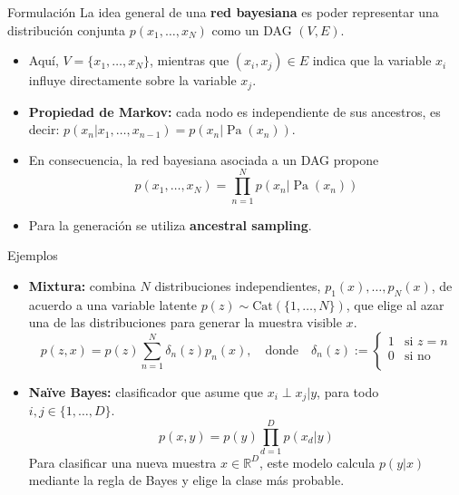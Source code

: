 \documentclass{beamer}
\newcommand{\R}{\mathbb{R}}
\begin{document}
\begin{frame}{Formulación}
    La idea general de una \textbf{red bayesiana} es poder representar una distribución conjunta $p(x_1,\ldots,x_N)$ como un DAG $(V,E)$.
    \begin{itemize}
        \item Aquí, $V=\{x_1,\ldots,x_N\}$, mientras que $(x_i,x_j)\in E$ indica que la variable $x_i$ influye directamente sobre la variable $x_j$.
        \item \textbf{Propiedad de Markov:} cada nodo es independiente de sus ancestros, es decir: $p(x_n|x_1,\ldots,x_{n-1})=p(x_n|\operatorname{Pa}(x_n))$.
        \item En consecuencia, la red bayesiana asociada a un DAG propone
              \begin{equation*}
                  p(x_1,\ldots,x_N)=\prod_{n=1}^N
                  p(x_n|\operatorname{Pa}(x_n))
              \end{equation*}
        \item Para la generación se utiliza \textbf{ancestral sampling}.
    \end{itemize}
\end{frame}

\begin{frame}{Ejemplos}
    \begin{itemize}
        \item \textbf{Mixtura:} combina $N$ distribuciones independientes, $p_1(x),\ldots,p_N(x)$, de acuerdo a una variable latente $p(z)\sim\text{Cat}(\{1,\ldots,N\})$, que elige al azar una de las distribuciones para generar la muestra visible $x$.
              \begin{equation*}
                  p(z,x)=p(z)\sum_{n=1}^N \delta_{n}(z)p_n(x),
                  \quad\text{donde}\quad
                  \delta_{n}(z):=
                  \begin{cases}
                      1 & \text{si }z=n \\
                      0 & \text{si no}    \\
                  \end{cases}
              \end{equation*}
        \item \textbf{Naïve Bayes:} clasificador que asume que $x_i\perp x_j|y$, para todo $i,j\in\{1,\ldots,D\}.$
              \begin{equation*}
                  p(x,y)=p(y)\prod_{d=1}^D p(x_d|y)
              \end{equation*}
              Para clasificar una nueva muestra $x\in\R^D$, este modelo calcula $p(y|x)$ mediante la regla de Bayes y elige la clase más probable.
    \end{itemize}
\end{frame}
\end{document}
